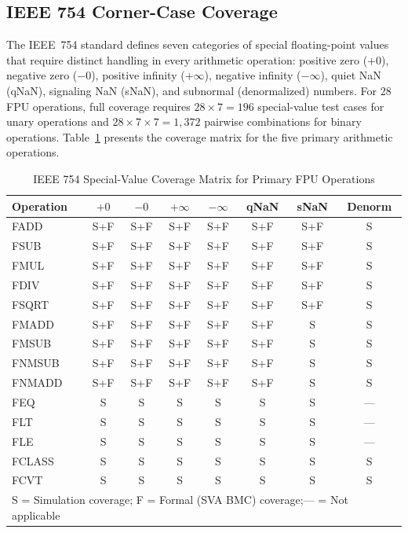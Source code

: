 \documentclass[journal]{IEEEtran}
\begin{document}
\subsection{IEEE 754 Corner-Case Coverage}
\label{sec:fpu_coverage}

The IEEE~754 standard defines seven categories of special floating-point
values that require distinct handling in every arithmetic operation:
positive zero ($+0$), negative zero ($-0$), positive infinity
($+\infty$), negative infinity ($-\infty$), quiet NaN (qNaN), signaling
NaN (sNaN), and subnormal (denormalized) numbers.  For 28 FPU
operations, full coverage requires $28 \times 7 = 196$ special-value
test cases for unary operations and $28 \times 7 \times 7 = 1{,}372$
pairwise combinations for binary operations.
Table~\ref{tab:ieee754_coverage} presents the coverage matrix for the
five primary arithmetic operations.

\begin{table}[!t]
\centering
\caption{IEEE 754 Special-Value Coverage Matrix for Primary FPU Operations}
\label{tab:ieee754_coverage}
\renewcommand{\arraystretch}{1.15}
\footnotesize
\begin{tabular}{lccccccc}
\toprule
\textbf{Operation} & \textbf{$+0$} & \textbf{$-0$}
  & \textbf{$+\infty$} & \textbf{$-\infty$}
  & \textbf{qNaN} & \textbf{sNaN} & \textbf{Denorm} \\
\midrule
FADD   & S+F & S+F & S+F & S+F & S+F & S+F & S \\
FSUB   & S+F & S+F & S+F & S+F & S+F & S+F & S \\
FMUL   & S+F & S+F & S+F & S+F & S+F & S+F & S \\
FDIV   & S+F & S+F & S+F & S+F & S+F & S+F & S \\
FSQRT  & S+F & S+F & S+F & S+F & S+F & S+F & S \\
FMADD  & S+F & S+F & S+F & S+F & S+F & S   & S \\
FMSUB  & S+F & S+F & S+F & S+F & S+F & S   & S \\
FNMSUB & S+F & S+F & S+F & S+F & S+F & S   & S \\
FNMADD & S+F & S+F & S+F & S+F & S+F & S   & S \\
FEQ    & S   & S   & S   & S   & S   & S   & --- \\
FLT    & S   & S   & S   & S   & S   & S   & --- \\
FLE    & S   & S   & S   & S   & S   & S   & --- \\
FCLASS & S   & S   & S   & S   & S   & S   & S \\
FCVT   & S   & S   & S   & S   & S   & S   & S \\
\bottomrule
\multicolumn{8}{l}{\scriptsize S = Simulation coverage;\quad
F = Formal (SVA BMC) coverage;\quad --- = Not applicable}
\end{tabular}
\end{table}
\end{document}
